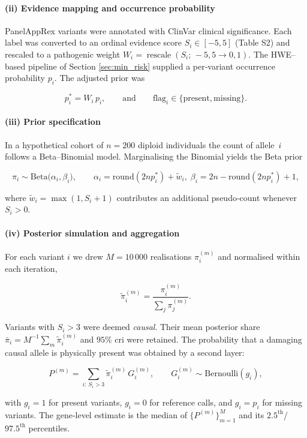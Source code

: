 \paragraph{(ii) Evidence mapping and occurrence probability}
PanelAppRex variants were annotated with ClinVar clinical significance.  Each label was converted to an ordinal evidence score $S_i\in[-5,5]$ (Table S2) and rescaled to a pathogenic weight $W_i=\operatorname{rescale}(S_i;\,-5,5\rightarrow0,1)$.  The HWE–based pipeline of Section \ref{sec:min_risk} supplied a per‑variant occurrence probability $p_i$.  The adjusted prior was

\[
p_{i}^{\ast}=W_i\,p_i,
\qquad
\text{and}\qquad
\mathrm{flag}_i\in\{\text{present},\text{missing}\}.
\]

\paragraph{(iii) Prior specification}
In a hypothetical cohort of $n=200$ diploid individuals the count of allele~$i$ follows a Beta–Binomial model.  Marginalising the Binomial yields the Beta prior

\[
\pi_i\sim\mathrm{Beta}\!\bigl(\alpha_i,\beta_i\bigr),\qquad
\alpha_i=\mathrm{round}(2np_{i}^{\ast})+\tilde w_i,\;
\beta_i = 2n-\mathrm{round}(2np_{i}^{\ast})+1,
\]

where $\tilde w_i=\max(1,S_i+1)$ contributes an additional pseudo‑count whenever $S_i>0$.

\paragraph{(iv) Posterior simulation and aggregation}
For each variant $i$ we drew $M=10\,000$ realisations $\pi_{i}^{(m)}$ and normalised within each iteration,

\[
\tilde\pi_{i}^{(m)}=\frac{\pi_{i}^{(m)}}{\sum_{j}\pi_{j}^{(m)}}.
\]

Variants with $S_i>3$ were deemed \emph{causal}.  Their mean posterior share $\bar\pi_i=M^{-1}\sum_m\tilde\pi_{i}^{(m)}$ and $95\%$ \ac{cri} were retained.  The probability that a damaging causal allele is physically present was obtained by a second layer:

\[
P^{(m)}=\sum_{i:\,S_i>3}\tilde\pi_{i}^{(m)}\,G_{i}^{(m)},\qquad
G_{i}^{(m)}\sim\mathrm{Bernoulli}(g_i),
\]

with $g_i=1$ for present variants, $g_i=0$ for reference calls, and $g_i=p_i$ for missing variants.  The gene‑level estimate is the median of $\{P^{(m)}\}_{m=1}^{M}$ and its $2.5^{\text{th}}$/$97.5^{\text{th}}$ percentiles.

